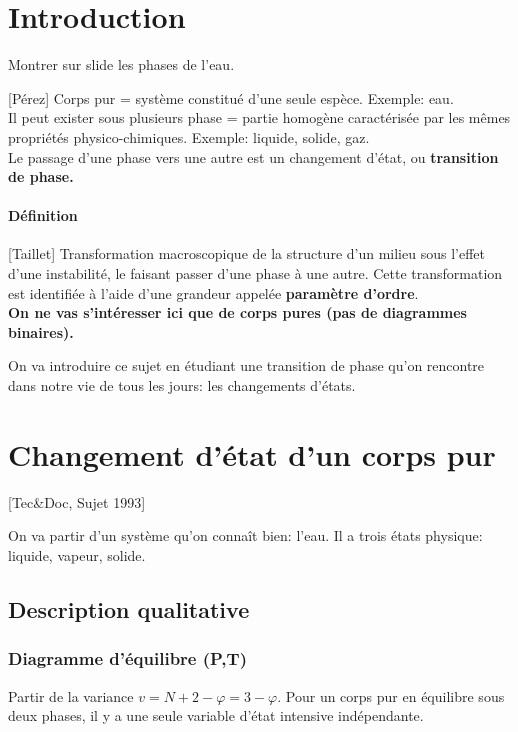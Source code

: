 \documentclass[11pt]{report}
\numberwithin{figure}{section}
\numberwithin{equation}{section}
\numberwithin{table}{section}
\newcommand{\1}{\boldsymbol{1}}
\begin{document}
\section*{Introduction}

Montrer sur slide les phases de l'eau. 

[Pérez] Corps pur = système constitué d'une seule espèce. Exemple: eau. \\
Il peut exister sous plusieurs phase = partie homogène caractérisée par les mêmes propriétés physico-chimiques. Exemple: liquide, solide, gaz. \\

\noindent Le passage d'une phase vers une autre est un changement d'état, ou \textbf{transition de phase.} 

\paragraph{Définition} [Taillet] Transformation macroscopique de la structure d'un milieu sous l'effet d'une instabilité, le faisant passer d'une phase à une autre. Cette transformation est identifiée à l'aide d'une grandeur appelée \textbf{paramètre d'ordre}. \\

\textbf{On ne vas s’intéresser ici que de corps pures (pas de diagrammes binaires).}


On va introduire ce sujet en étudiant une transition de phase qu'on rencontre dans notre vie de tous les jours: les changements d'états.

\section{Changement d'état d'un corps pur}

[Tec\&Doc, Sujet 1993]

On va partir d'un système qu'on connaît bien: l'eau. Il a trois états physique: liquide, vapeur, solide.

\subsection{Description qualitative}

\subsubsection{Diagramme d'équilibre (P,T)}

Partir de la variance $v = N + 2 - \varphi = 3-\varphi$. Pour un corps pur en équilibre sous deux phases, il y a une seule variable d'état intensive indépendante. \\ 
\end{document}
